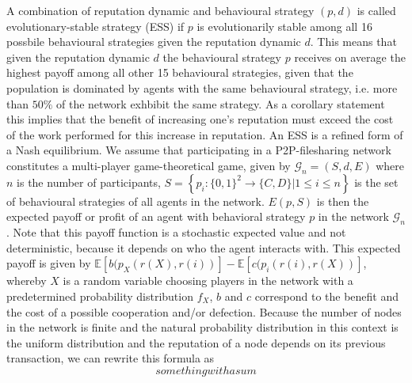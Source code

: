 \documentclass[11pt,a4paper]{report}
\theoremstyle{definition}
\theoremstyle{theorem}
\theoremstyle{proposition}
\theoremstyle{corollary}
\theoremstyle{lemma}
\theoremstyle{example}
\theoremstyle{remark}
\begin{document}
A combination of reputation dynamic and behavioural strategy $(p,d)$ is called evolutionary-stable strategy (ESS) if $p$ is evolutionarily stable among all 16 possbile behavioural strategies given the reputation dynamic $d$. This means that given the reputation dynamic $d$ the behavioural strategy $p$ receives on average the highest payoff among all other 15 behavioural strategies, given that the population is dominated by agents with the same behavioural strategy, i.e. more than $50\%$ of the network exhbibit the same strategy. As a corollary statement this implies that the benefit of increasing one's reputation must exceed the cost of the work performed for this increase in reputation. An ESS is a refined form of a Nash equilibrium. We assume that participating in a P2P-filesharing network constitutes a multi-player game-theoretical game, given by $\mathcal{G}_n=(S,d,E)$ where $n$ is the number of participants, $S=\left\lbrace{}p_i:\{0,1\}^2\rightarrow{}\{C,D\}|1\leq{}i\leq{}n\right\rbrace$ is the set of behavioural strategies of all agents in the network. $E(p,S)$ is then the expected payoff or profit of an agent with behavioral strategy $p$ in the network $\mathcal{G}_n$. Note that this payoff function is a stochastic expected value and not deterministic, because it depends on who the agent interacts with. This expected payoff is given by $\mathbb{E}[b(p_X(r(X),r(i))]-\mathbb{E}[c(p_i(r(i),r(X))]$, whereby $X$ is a random variable choosing players in the network with a predetermined probability distribution $f_X$, $b$ and $c$ correspond to the benefit and the cost of a possible cooperation and/or defection. Because the number of nodes in the network is finite and the natural probability distribution in this context is the uniform distribution and the reputation of a node depends on its previous transaction, we can rewrite this formula as
\[
something with a sum
\]    
\end{document}
